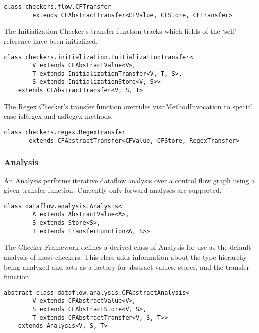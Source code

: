     \begin{verbatim}class checkers.flow.CFTransfer
        extends CFAbstractTransfer<CFValue, CFStore, CFTransfer>\end{verbatim}
    
    The Initialization Checker's transfer function tracks which fields of the `self' reference have been initialized.
    
    \begin{verbatim}class checkers.initialization.InitializationTransfer<
        V extends CFAbstractValue<V>,
        T extends InitializationTransfer<V, T, S>,
        S extends InitializationStore<V, S>>
    extends CFAbstractTransfer<V, S, T>\end{verbatim}

    The Regex Checker's transfer function overrides visitMethodInvocation to special case isRegex and asRegex methods.

    \begin{verbatim}class checkers.regex.RegexTransfer
       extends CFAbstractTransfer<CFValue, CFStore, RegexTransfer>\end{verbatim}


\subsubsection{Analysis}
\label{sec:analysis_classes}

    An Analysis performs iterative dataflow analysis over a control flow graph using a given transfer function.  Currently only forward analyses are supported.

    \begin{verbatim}class dataflow.analysis.Analysis<
        A extends AbstractValue<A>,
        S extends Store<S>,
        T extends TransferFunction<A, S>>\end{verbatim}

    The Checker Framework defines a derived class of Analysis for use as the default analysis of most checkers.  This class adds information about the type hierarchy being analyzed and acts as a factory for abstract values, stores, and the transfer function.

    \begin{verbatim}abstract class dataflow.analysis.CFAbstractAnalysis<
        V extends CFAbstractValue<V>,
        S extends CFAbstractStore<V, S>,
        T extends CFAbstractTransfer<V, S, T>>
    extends Analysis<V, S, T>\end{verbatim}
    
